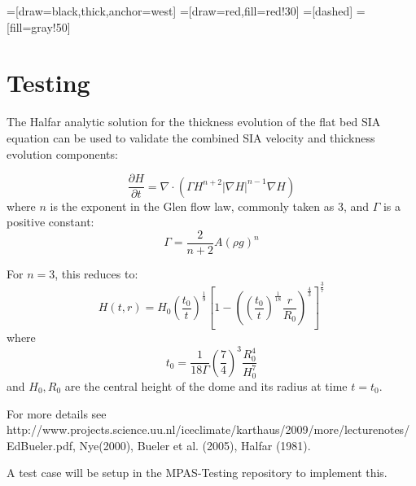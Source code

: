 \documentclass[11pt]{report}
\begin{document}
=[draw=black,thick,anchor=west]
=[draw=red,fill=red!30]
=[dashed]  %
=[fill=gray!50]




\chapter{Testing}

The Halfar analytic solution for the thickness evolution of the flat bed SIA equation can be used to validate the combined SIA velocity and thickness evolution components:

\begin{equation}
    \label{halfar}
    \frac{\partial H}{\partial t} = \nabla \cdot (\Gamma H^{n+2} |\nabla H|^{n-1} \nabla H)
\end{equation}
where $n$ is the exponent in the Glen flow law, commonly taken as 3, and $\Gamma$ is a positive constant:
\begin{equation}
    \Gamma = \frac{2}{n+2} A (\rho g)^n
\end{equation}

For $n=3$, this reduces to:
\begin{equation}
    H(t,r) = H_0 \left(\frac{t_0}{t}\right)^\frac{1}{9}  \left[ 1 - \left(  \left( \frac{t_0}{t} \right) ^ \frac{1}{18} \frac{r}{R_0} \right)^\frac{4}{3} \right] ^ \frac{3}{7}
\end{equation}
where
\begin{equation}
    t_0 = \frac{1}{18\Gamma} \left( \frac{7}{4} \right)^3 \frac{R_0^4}{H_0^7}
\end{equation}
and $H_0, R_0$ are the central height of the dome and its radius at time $t=t_0$.

For more details see http://www.projects.science.uu.nl/iceclimate/karthaus/2009/more/lecturenotes/EdBueler.pdf,  Nye(2000), Bueler et al. (2005), Halfar (1981).

A test case will be setup in the MPAS-Testing repository to implement this.

\end{document}
